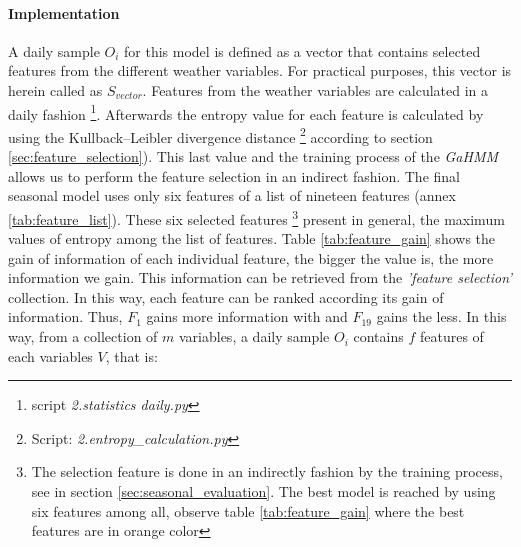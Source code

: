 \paragraph{Implementation}  

A daily sample $O_i$ for this model is defined as a vector that contains selected features from the different weather variables. For practical purposes, this vector is herein called as $S_{vector}$. Features from the weather variables are calculated in a daily fashion \footnote{script \textit{2.statistics daily.py}}. Afterwards the entropy value for each feature is calculated by using the Kullback–Leibler divergence distance \footnote{Script: \textit{2.entropy\_calculation.py}} according to section \ref{sec:feature_selection}). This last value and the training process of the \textit{GaHMM} allows us to perform the feature selection in an indirect fashion. The final seasonal model uses only six features of a list of nineteen features (annex \ref{tab:feature_list}). These six selected features \footnote{The selection feature is done in an indirectly fashion by the training process, see in section \ref{sec:seasonal_evaluation}. The best model is reached by using six features among all, observe table \ref{tab:feature_gain} where the best features are in orange color} present in general, the maximum values of entropy among the list of features. Table \ref{tab:feature_gain} shows the gain of information of each individual feature, the bigger the value is, the more information we gain. This information can be retrieved from the \textit{'feature selection'} collection. In this way, each feature can be ranked according its gain of information. Thus, $F_1$ gains more information with and $F_{19}$ gains the less. In this way, from a collection of $m$ variables, a daily sample $O_i$ contains $f$ features of each variables $V$, that is:


